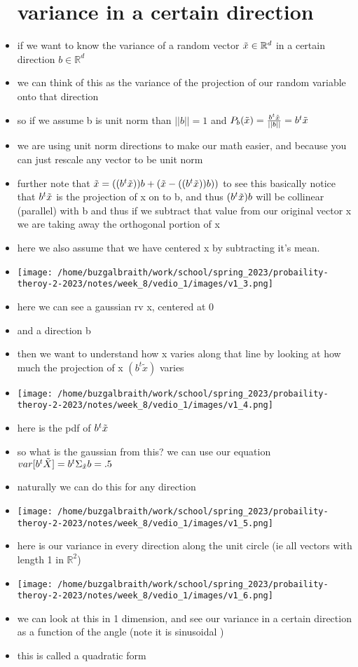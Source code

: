 \documentclass{article}
\begin{document}
\begin{itemize}
\section{variance in a certain direction}
\item if we want to know the variance of a random vector $\Tilde{x}\in \mathbb{R}^{d}$ in a certain direction $b\in \mathbb{R}^{d}$
\item we can think of this  as the variance of  the projection of our random variable onto that direction
\item so if we assume b is unit norm  than $||b||=1$ and $P_{b}(\Tilde{x})=\frac{b^t\Tilde{x}}{||b||}=b^t\Tilde{x}$
\item we are using unit norm directions to make our math easier, and because you can just rescale any vector to be unit norm 
\item further note that $\Tilde{x}=((b^t\Tilde{x}))b+(\Tilde{x}-((b^t\Tilde{x}))b))$ to see this basically notice that $b^t\Tilde{x}$ is the projection of x on to b, and thus $(b^t\Tilde{x})b$ will be collinear (parallel) with b and thus if we subtract that value from our original vector x we are taking away the orthogonal portion of x
\item  here we also assume that we have centered x by subtracting it's mean. 
\item \texttt{[image: /home/buzgalbraith/work/school/spring\_2023/probaility-theroy-2-2023/notes/week\_8/vedio\_1/images/v1\_3.png]}
\item  here we can see a gaussian rv x, centered at 0 
\item and a direction b
\item then we want to understand how x varies along that line by looking at how much the projection of x $(b^t\tilde{x})$ varies
\item \texttt{[image: /home/buzgalbraith/work/school/spring\_2023/probaility-theroy-2-2023/notes/week\_8/vedio\_1/images/v1\_4.png]}
\item here is the pdf of $b^t\Tilde{x}$
\item so what is the gaussian from this? we can use our equation $var[b^t\Tilde{X}]=b^t\Sigma_{\Tilde{x}}b=.5$
\item naturally we can do this for any direction
\item \texttt{[image: /home/buzgalbraith/work/school/spring\_2023/probaility-theroy-2-2023/notes/week\_8/vedio\_1/images/v1\_5.png]}
\item here is our variance in every direction along the unit circle (ie all vectors with length 1 in $\mathbb{R}^{2}$)
\item \texttt{[image: /home/buzgalbraith/work/school/spring\_2023/probaility-theroy-2-2023/notes/week\_8/vedio\_1/images/v1\_6.png]}
\item we can look at this in 1 dimension, and see our variance in a certain direction as a function of the angle (note it is sinusoidal )
\item this is called a quadratic form 

\end{itemize}
\end{document}
